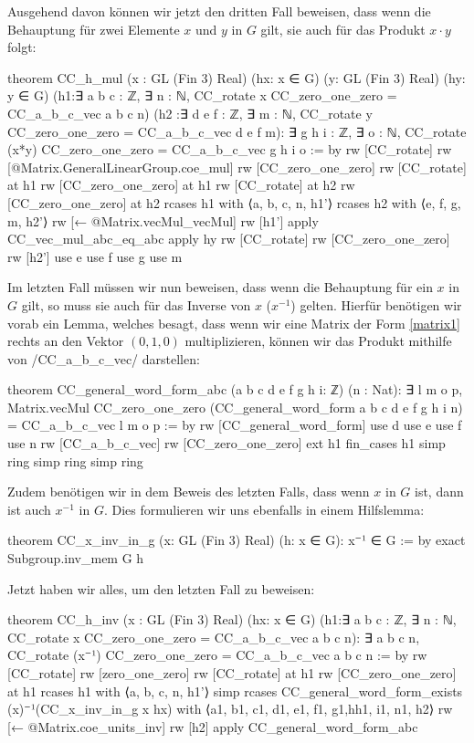 \documentclass[10pt]{article}
\begin{document}
\noindent Ausgehend davon können wir jetzt den dritten Fall beweisen, dass wenn die Behauptung für zwei Elemente $x$ und $y$ in $G$ gilt, sie auch für das Produkt $x\cdot y$ folgt:
\begin{leancode}
theorem CC_h_mul (x : GL (Fin 3) Real) (hx: x ∈ G) (y: GL (Fin 3) Real) (hy: y ∈ G) 
(h1:∃ a b c : ℤ, ∃ n : ℕ, CC_rotate x CC_zero_one_zero = CC_a_b_c_vec a b c n)
(h2 :∃ d e f : ℤ, ∃ m : ℕ, CC_rotate y CC_zero_one_zero = CC_a_b_c_vec d e f m):
∃ g h i : ℤ, ∃ o : ℕ, CC_rotate (x*y) CC_zero_one_zero = CC_a_b_c_vec g h i o := by
  rw [CC_rotate]
  rw [@Matrix.GeneralLinearGroup.coe_mul]
  rw [CC_zero_one_zero]
  rw [CC_rotate] at h1
  rw [CC_zero_one_zero] at h1
  rw [CC_rotate] at h2
  rw [CC_zero_one_zero] at h2
  rcases h1 with ⟨a, b, c, n, h1'⟩
  rcases h2 with ⟨e, f, g, m, h2'⟩
  rw [← @Matrix.vecMul_vecMul]
  rw [h1']
  apply CC_vec_mul_abc_eq_abc
  apply hy
  rw [CC_rotate]
  rw [CC_zero_one_zero]
  rw [h2']
  use e
  use f
  use g
  use m
\end{leancode}
\noindent Im letzten Fall müssen wir nun beweisen, dass wenn die Behauptung für ein $x$ in $G$ gilt, so muss sie auch für das Inverse von $x$ ($x^{-1}$) gelten. Hierfür  benötigen wir vorab ein Lemma, welches besagt, dass  wenn wir eine Matrix der Form \ref{matrix1} rechts an den Vektor $(0,1,0)$ multiplizieren, können wir das Produkt mithilfe von \lean/CC_a_b_c_vec/ darstellen:
\begin{leancode}
theorem CC_general_word_form_abc (a b c d e f g h i: ℤ) (n : Nat):
  ∃ l m o p, Matrix.vecMul CC_zero_one_zero (CC_general_word_form a b c d e f g h i n) =
    CC_a_b_c_vec l m o p := by
    rw [CC_general_word_form]
    use d
    use e
    use f
    use n
    rw [CC_a_b_c_vec]
    rw [CC_zero_one_zero]
    ext h1
    fin_cases h1
    simp
    ring
    simp
    ring
    simp
    ring
\end{leancode}
\noindent Zudem benötigen wir in dem Beweis des letzten Falls, dass wenn $x$ in $G$ ist, dann ist auch $x^{-1}$ in $G$. Dies formulieren wir uns ebenfalls in einem Hilfslemma:
\begin{leancode} 
theorem CC_x_inv_in_g (x: GL (Fin 3) Real) (h: x ∈ G): x⁻¹ ∈ G := by
  exact Subgroup.inv_mem G h 
\end{leancode}
\noindent Jetzt haben wir alles, um den letzten Fall zu beweisen:
\begin{leancode}
theorem CC_h_inv (x : GL (Fin 3) Real) (hx: x ∈ G)   
  (h1:∃ a b c : ℤ, ∃ n : ℕ, CC_rotate x CC_zero_one_zero = CC_a_b_c_vec a b c n):
  ∃ a b c n, CC_rotate (x⁻¹) CC_zero_one_zero = CC_a_b_c_vec a b c n := by
  rw [CC_rotate]
  rw [zero_one_zero]
  rw [CC_rotate] at h1
  rw [CC_zero_one_zero] at h1
  rcases h1 with ⟨a, b, c, n, h1'⟩
  simp
  rcases CC_general_word_form_exists (x)⁻¹(CC_x_inv_in_g x hx) with
  ⟨a1, b1, c1, d1, e1, f1, g1,hh1,  i1, n1, h2⟩
  rw [← @Matrix.coe_units_inv]
  rw [h2]
  apply CC_general_word_form_abc
\end{leancode}
\end{document}
